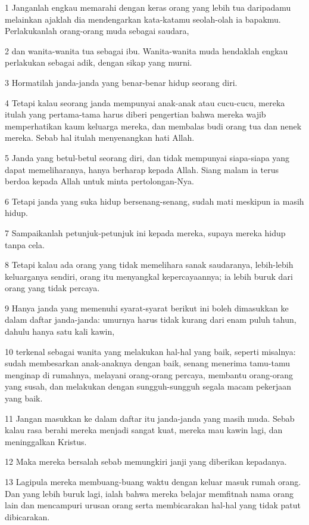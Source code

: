 \par 1 Janganlah engkau memarahi dengan keras orang yang lebih tua daripadamu melainkan ajaklah dia mendengarkan kata-katamu seolah-olah ia bapakmu. Perlakukanlah orang-orang muda sebagai saudara,
\par 2 dan wanita-wanita tua sebagai ibu. Wanita-wanita muda hendaklah engkau perlakukan sebagai adik, dengan sikap yang murni.
\par 3 Hormatilah janda-janda yang benar-benar hidup seorang diri.
\par 4 Tetapi kalau seorang janda mempunyai anak-anak atau cucu-cucu, mereka itulah yang pertama-tama harus diberi pengertian bahwa mereka wajib memperhatikan kaum keluarga mereka, dan membalas budi orang tua dan nenek mereka. Sebab hal itulah menyenangkan hati Allah.
\par 5 Janda yang betul-betul seorang diri, dan tidak mempunyai siapa-siapa yang dapat memeliharanya, hanya berharap kepada Allah. Siang malam ia terus berdoa kepada Allah untuk minta pertolongan-Nya.
\par 6 Tetapi janda yang suka hidup bersenang-senang, sudah mati meskipun ia masih hidup.
\par 7 Sampaikanlah petunjuk-petunjuk ini kepada mereka, supaya mereka hidup tanpa cela.
\par 8 Tetapi kalau ada orang yang tidak memelihara sanak saudaranya, lebih-lebih keluarganya sendiri, orang itu menyangkal kepercayaannya; ia lebih buruk dari orang yang tidak percaya.
\par 9 Hanya janda yang memenuhi syarat-syarat berikut ini boleh dimasukkan ke dalam daftar janda-janda: umurnya harus tidak kurang dari enam puluh tahun, dahulu hanya satu kali kawin,
\par 10 terkenal sebagai wanita yang melakukan hal-hal yang baik, seperti misalnya: sudah membesarkan anak-anaknya dengan baik, senang menerima tamu-tamu menginap di rumahnya, melayani orang-orang percaya, membantu orang-orang yang susah, dan melakukan dengan sungguh-sungguh segala macam pekerjaan yang baik.
\par 11 Jangan masukkan ke dalam daftar itu janda-janda yang masih muda. Sebab kalau rasa berahi mereka menjadi sangat kuat, mereka mau kawin lagi, dan meninggalkan Kristus.
\par 12 Maka mereka bersalah sebab memungkiri janji yang diberikan kepadanya.
\par 13 Lagipula mereka membuang-buang waktu dengan keluar masuk rumah orang. Dan yang lebih buruk lagi, ialah bahwa mereka belajar memfitnah nama orang lain dan mencampuri urusan orang serta membicarakan hal-hal yang tidak patut dibicarakan.
